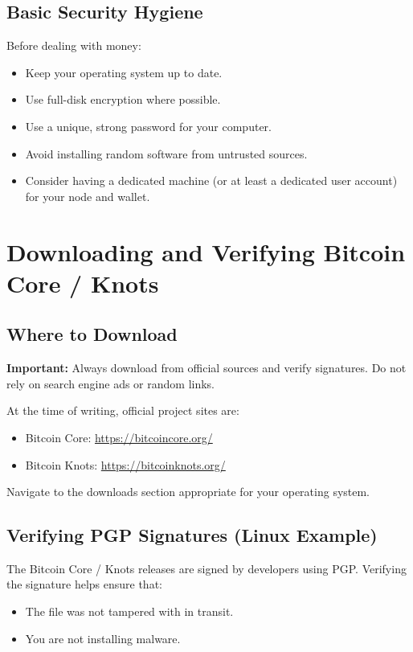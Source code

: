 \documentclass[12pt,a4paper]{book}
\begin{document}
\section{Basic Security Hygiene}

Before dealing with money:

\begin{itemize}
  \item Keep your operating system up to date.
  \item Use full-disk encryption where possible.
  \item Use a unique, strong password for your computer.
  \item Avoid installing random software from untrusted sources.
  \item Consider having a dedicated machine (or at least a dedicated user account) for your node and wallet.
\end{itemize}

\chapter{Downloading and Verifying Bitcoin Core / Knots}

\section{Where to Download}

\textbf{Important:} Always download from official sources and verify signatures. Do not rely on search engine ads or random links.

At the time of writing, official project sites are:

\begin{itemize}
  \item Bitcoin Core: \url{https://bitcoincore.org/}
  \item Bitcoin Knots: \url{https://bitcoinknots.org/}
\end{itemize}

Navigate to the downloads section appropriate for your operating system.

\section{Verifying PGP Signatures (Linux Example)}

The Bitcoin Core / Knots releases are signed by developers using PGP. Verifying the signature helps ensure that:

\begin{itemize}
  \item The file was not tampered with in transit.
  \item You are not installing malware.
\end{itemize}
\end{document}
